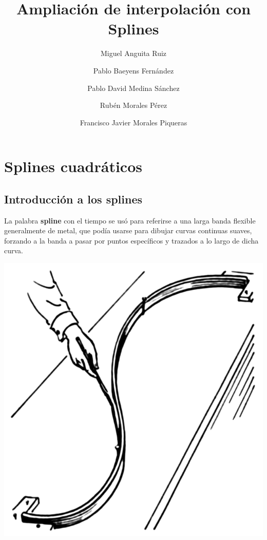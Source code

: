 \documentclass[11pt,spanish,]{article}
\title{Ampliación de interpolación con Splines}
\author{Miguel Anguita Ruiz \and Pablo Baeyens Fernández \and Pablo David Medina Sánchez \and Rubén Morales Pérez \and Francisco Javier Morales Piqueras}
\theoremstyle{definition} \newtheorem*{definicion}{Definición}
\begin{document}
\maketitle

{
\hypersetup{linkcolor=black}
\setcounter{tocdepth}{3}
\tableofcontents
}
\pagebreak
\newpage
\pagebreak

\section{Splines cuadráticos}\label{splines-cuadruxe1ticos}

\subsection{Introducción a los
splines}\label{introducciuxf3n-a-los-splines}

La palabra \textbf{spline} con el tiempo se usó para referirse a una
larga banda flexible generalmente de metal, que podía usarse para
dibujar curvas continuas suaves, forzando a la banda a pasar por puntos
específicos y trazados a lo largo de dicha curva.

\begin{center}
\includegraphics[scale=0.25]{spline.png}
\end{center}
\end{document}
